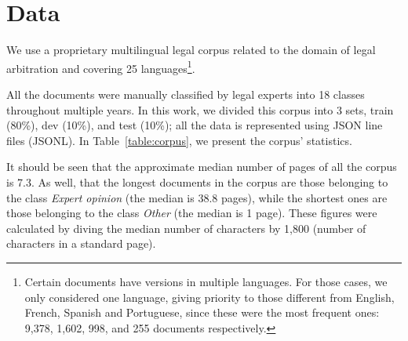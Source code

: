 \documentclass[11pt]{article}
\begin{document}
\section{Data}
\label{sec: Data}

    We use a proprietary multilingual legal corpus related to the domain of legal arbitration and covering 25 languages\footnote{Certain documents have versions in multiple languages. For those cases, we only considered one language, giving priority to those different from English, French, Spanish and Portuguese, since these were the most frequent ones: 9,378, 1,602, 998, and 255 documents respectively.}.
    
    All the documents were manually classified by legal experts into 18 classes throughout multiple years. In this work, we divided this corpus into 3 sets, train (80\%), dev (10\%), and test (10\%); all the data is represented using JSON line files (JSONL). 
    In Table~\ref{table:corpus}, we present the corpus' statistics.

    It should be seen that the approximate median number of pages of all the corpus is 7.3. As well, that the longest documents in the corpus are those belonging to the class \textit{Expert opinion} (the median is 38.8 pages), while the shortest ones are those belonging to the class \textit{Other} (the median is 1 page). These figures were calculated by diving the median number of characters by 1,800 (number of characters in a standard page).
\end{document}
